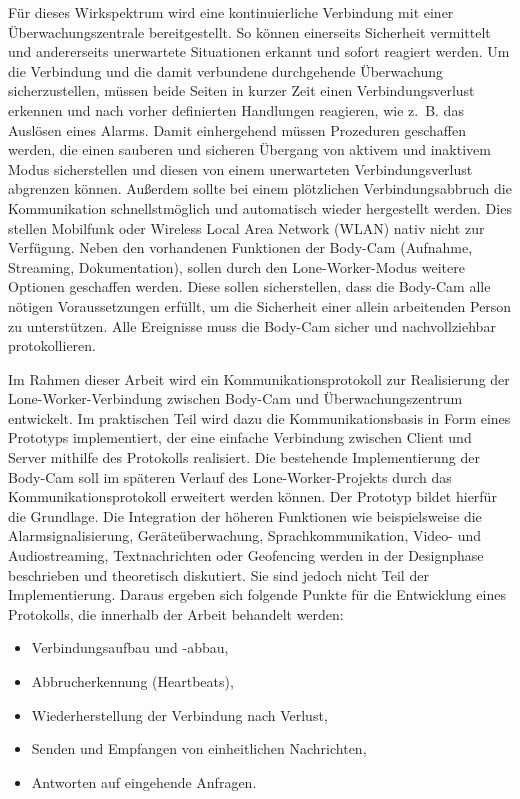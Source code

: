 \documentclass[thesis.tex]{subfiles}
\begin{document}
Für dieses Wirkspektrum wird eine kontinuierliche Verbindung mit einer Überwachungszentrale bereitgestellt.
So können einerseits Sicherheit vermittelt und andererseits unerwartete Situationen erkannt und sofort reagiert werden.
Um die Verbindung und die damit verbundene durchgehende Überwachung sicherzustellen, müssen beide Seiten in kurzer Zeit einen Verbindungsverlust erkennen und nach vorher definierten Handlungen reagieren, wie z.~B. das Auslösen eines Alarms.
Damit einhergehend müssen Prozeduren geschaffen werden, die einen sauberen und sicheren Übergang von aktivem und inaktivem Modus sicherstellen und diesen von einem unerwarteten Verbindungsverlust abgrenzen können.
Außerdem sollte bei einem plötzlichen Verbindungsabbruch die Kommunikation schnellstmöglich und automatisch wieder hergestellt werden.
Dies stellen Mobilfunk oder \glqq Wireless Local Area Network\grqq{} (WLAN) nativ nicht zur Verfügung.
Neben den vorhandenen Funktionen der Body-Cam (Aufnahme, Streaming, Dokumentation), sollen durch den Lone-Worker-Modus weitere Optionen geschaffen werden.
Diese sollen sicherstellen, dass die Body-Cam alle nötigen Voraussetzungen erfüllt, um die Sicherheit einer allein arbeitenden Person zu unterstützen.
Alle Ereignisse muss die Body-Cam sicher und nachvollziehbar protokollieren.

Im Rahmen dieser Arbeit wird ein Kommunikationsprotokoll zur Realisierung der Lone-Worker-Verbindung zwischen Body-Cam und Überwachungszentrum entwickelt.
Im praktischen Teil wird dazu die Kommunikationsbasis in Form eines Prototyps implementiert, der eine einfache Verbindung zwischen Client und Server mithilfe des Protokolls realisiert.
Die bestehende Implementierung der Body-Cam soll im späteren Verlauf des Lone-Worker-Projekts durch das Kommunikationsprotokoll erweitert werden können.
Der Prototyp bildet hierfür die Grundlage.
Die Integration der höheren Funktionen wie beispielsweise die Alarmsignalisierung, Geräteüberwachung, Sprachkommunikation, Video- und Audiostreaming, Textnachrichten oder Geofencing werden in der Designphase beschrieben und theoretisch diskutiert.
Sie sind jedoch nicht Teil der Implementierung.
Daraus ergeben sich folgende Punkte für die Entwicklung eines Protokolls, die innerhalb der Arbeit behandelt werden:
\begin{itemize}
    \item Verbindungsaufbau und -abbau,
    \item Abbrucherkennung (Heartbeats),
    \item Wiederherstellung der Verbindung nach Verlust,
    \item Senden und Empfangen von einheitlichen Nachrichten,
    \item Antworten auf eingehende Anfragen.
\end{itemize}
\end{document}
